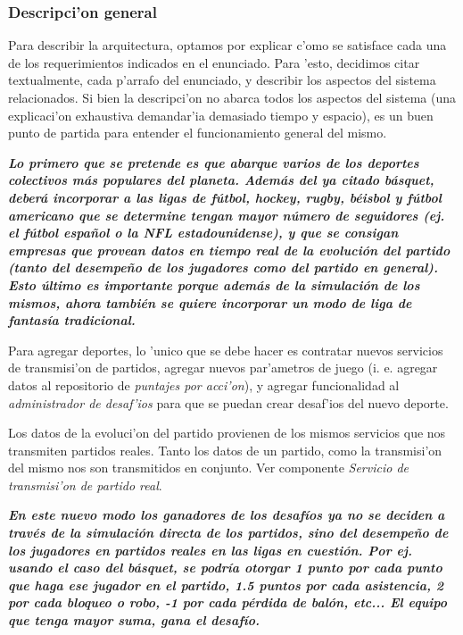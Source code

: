\subsubsection{Descripci'on general}

Para describir la arquitectura, optamos por explicar c'omo se satisface cada una de los requerimientos indicados en el enunciado. Para 'esto, decidimos citar textualmente, cada p'arrafo del enunciado, y describir los aspectos del sistema relacionados. Si bien la descripci'on no abarca todos los aspectos del sistema (una explicaci'on exhaustiva demandar'ia demasiado tiempo y espacio), es un buen punto de partida para entender el funcionamiento general del mismo.

\textbf{\textit{Lo primero que se pretende es que abarque varios de los deportes colectivos más populares del planeta. Además del ya citado básquet, deberá incorporar a las ligas de fútbol, hockey, rugby, béisbol y fútbol americano que se determine tengan mayor número de seguidores (ej. el fútbol español o la NFL estadounidense), y que se consigan empresas que provean datos en tiempo real de la evolución del partido (tanto del desempeño de los jugadores como del partido en general). Esto último es importante porque además de la simulación de los mismos, ahora también se quiere incorporar un modo de liga de fantasía tradicional.}}

Para agregar deportes, lo 'unico que se debe hacer es contratar nuevos servicios de transmisi'on de partidos, agregar nuevos par'ametros de juego (i. e. agregar datos al repositorio de \textit{puntajes por acci'on}), y agregar funcionalidad al \textit{administrador de desaf'ios} para que se puedan crear desaf'ios del nuevo deporte.

Los datos de la evoluci'on del partido provienen de los mismos servicios que nos transmiten partidos reales. Tanto los datos de un partido, como la transmisi'on del mismo nos son transmitidos en conjunto. Ver componente \textit{Servicio de transmisi'on de partido real}.

\textbf{\textit{En este nuevo modo los ganadores de los desafíos ya no se deciden a través de la simulación directa de los partidos, sino del desempeño de los jugadores en partidos reales en las ligas en cuestión. Por ej. usando el caso del básquet, se podría otorgar 1 punto por cada punto que haga ese jugador en el partido, 1.5 puntos por cada asistencia, 2 por cada bloqueo o robo, -1 por cada pérdida de balón, etc... El equipo que tenga mayor suma, gana el desafío.}}

